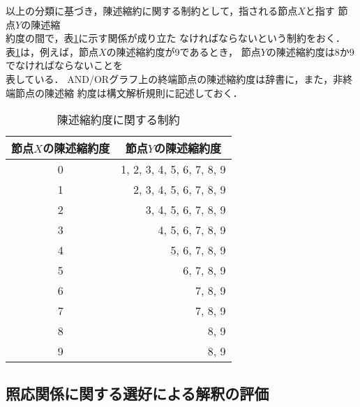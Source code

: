 以上の分類に基づき，\hspace*{-0.3mm}陳述縮約に関する制約として，\hspace*{-0.3mm}指される節点$X$と指す
節点$Y$の陳述縮\\約度の間で，表\ref{tab:depredlevel}に示す関係が成り立た
なければならないという制約をおく．
表\ref{tab:depredlevel}は，例えば，節点$X$の陳述縮約度が9であるとき，
節点$Y$の陳述縮約度は8か9でなければならないことを\\表している．
AND/ORグラフ上の終端節点の陳述縮約度は辞書に，また，非終端節点の陳述縮
約度は構文解析規則に記述しておく．
\begin{table}[htbp]
\caption{陳述縮約度に関する制約}
\label{tab:depredlevel}
\begin{center}
\begin{tabular}{|c|r|} \hline
節点$X$の陳述縮約度 & \multicolumn{1}{|c|}{節点$Y$の陳述縮約度} \\
\hline\hline
0 & 1, 2, 3, 4, 5, 6, 7, 8, 9 \\
1 &    2, 3, 4, 5, 6, 7, 8, 9 \\
2 &       3, 4, 5, 6, 7, 8, 9 \\
3 &          4, 5, 6, 7, 8, 9 \\
4 &             5, 6, 7, 8, 9 \\
5 &                6, 7, 8, 9 \\
6 &                   7, 8, 9 \\
7 &                   7, 8, 9 \\
8 &                      8, 9 \\
9 &                      8, 9 \\ \hline
\end{tabular}
\end{center}
\end{table}

\subsection{照応関係に関する選好による解釈の評価}
\label{sec:twg:eval}

